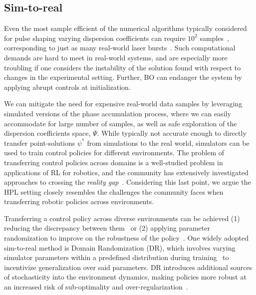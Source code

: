 \subsection{Sim-to-real}
Even the most sample efficient of the numerical algorithms typically considered for pulse shaping varying dispersion coefficients can require $10^2$ samples~\citep{capuano2022laser}, corresponding to just as many real-world laser bursts~\citep{shalloo2020automation}. Such computational demands are hard to meet in real-world systems, and are especially more troubling if one considers the instability of the solution found with respect to changes in the experimental setting. Further, BO can endanger the system by applying abrupt controls at initialization.

We can mitigate the need for expensive real-world data samples by leveraging simulated versions of the phase accumulation process, where we can easily accommodate for large number of samples, as well as safe exploration of the dispersion coefficients space, $\Psi$. While typically not accurate enough to directly transfer point-solutions $\psi^*$ from simulations to the real world, simulators can be used to train control policies for different environments. The problem of transferring control policies across domains is a well-studied problem in applications of RL for robotics, and the community has extensively investigated approaches to crossing the \emph{reality gap}~\citep{tobin2017domain, valassakis2020crossing}. Considering this last point, we argue the HPL setting closely resembles the challenges the community faces when transferring robotic policies across environments. 

Transferring a control policy across diverse environments can be achieved (1) reducing the discrepancy between them~\citep{zhu2017fast} or (2) applying parameter randomization to improve on the robustness of the policy~\citep{peng2018sim}. One widely adopted sim-to-real method is Domain Randomization (DR), which involves varying simulator parameters within a predefined distribution during training~\citep{valassakis2020crossing} to incentivize generalization over said parameters. DR introduces additional sources of stochasticity into the environment dynamics, making policies more robust at an increased risk of sub-optimality and over-regularization~\citep{margolis2024rapid}.

